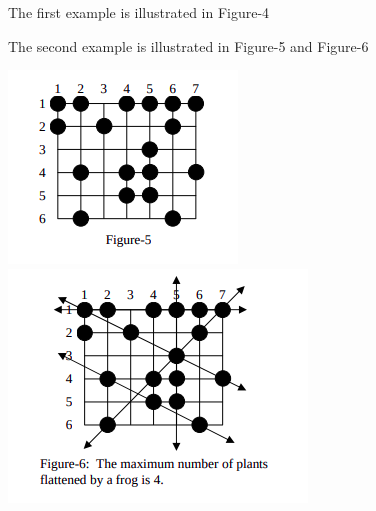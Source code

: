 The first example is illustrated in Figure-4

The second example is illustrated in Figure-5 and Figure-6


\includegraphics{4.png}
\includegraphics{5.png}